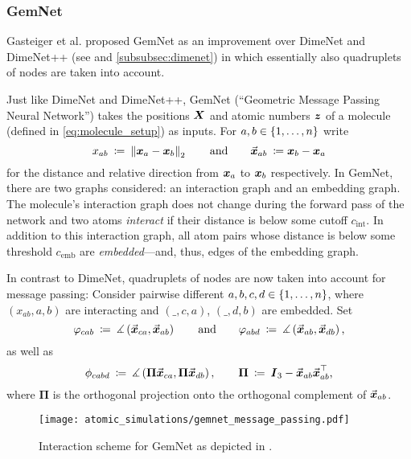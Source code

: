 \subsubsection{GemNet}
\label{subsubsec:gemnet}

Gasteiger et al. proposed GemNet \cite{https://doi.org/10.48550/arxiv.2106.08903} 
as an improvement over DimeNet and DimeNet++ (see 
\cite{DBLP:journals/corr/abs-2003-03123, https://doi.org/10.48550/arxiv.2011.14115} 
and \ref{subsubsec:dimenet}) in which essentially also quadruplets of nodes are
taken into account. 

Just like DimeNet and DimeNet++, GemNet (\enquote{Geometric Message Passing Neural Network}) takes the positions $\boldsymbol{X}$ and atomic numbers 
$\boldsymbol{z}$ of a molecule (defined in \eqref{eq:molecule_setup}) as inputs. For
$a, b \in \left\{1, \dots, n\right\}$ write
\[
    x_{ab} \: \coloneqq \: \left\lVert\boldsymbol{x}_a - \boldsymbol{x}_b\right\rVert_2 
    \qquad \text{and} \qquad 
    \vec{\boldsymbol{x}}_{ab} \: \coloneqq \boldsymbol{x}_b - \boldsymbol{x}_a
\]
for the distance and relative direction from $\boldsymbol{x}_a$ to $\boldsymbol{x}_b$ respectively.
In GemNet, there are two graphs considered: an interaction graph and an embedding graph.
The molecule's interaction graph does not change during the forward pass of the network and 
two atoms \textit{interact} if their distance is below some 
cutoff $c_{\text{int}}$. In addition to this interaction graph, all atom pairs 
whose distance is below some threshold $c_{\text{emb}}$ are \textit{embedded}---and, thus, edges 
of the embedding graph.

In contrast to DimeNet, quadruplets of 
nodes are now taken into account for message passing: Consider pairwise different $a, b, c, d \in \left\{1, \dots, n\right\}$,
where $(x_{ab}, a, b)$ are interacting and $(\_, c, a)$, $(\_, d, b)$ are
embedded. Set
\[
    \varphi_{cab} \: \coloneqq \: 
    \measuredangle \left( \vec{\boldsymbol{x}}_{ca}, \vec{\boldsymbol{x}}_{ab} \right)
    \qquad \text{and} \qquad
    \varphi_{abd} \: \coloneqq \: 
    \measuredangle \left( \vec{\boldsymbol{x}}_{ab}, \vec{\boldsymbol{x}}_{db} \right) \text{,}
\]
as well as 
\[
    \phi_{cabd} \: \coloneqq \: \measuredangle \left( \boldsymbol{\Pi} \vec{\boldsymbol{x}}_{ca}, \boldsymbol{\Pi} \vec{\boldsymbol{x}}_{db} \right),
    \qquad \boldsymbol{\Pi} \: \coloneqq \: \boldsymbol{I}_3 - \vec{\boldsymbol{x}}_{ab} \vec{\boldsymbol{x}}_{ab}^\top \text{,}
\]
where $\boldsymbol{\Pi}$ is the orthogonal projection onto the orthogonal
complement of $\vec{\boldsymbol{x}}_{ab}$.

\begin{figure}[H]
    \centering
    \texttt{[image: atomic\_simulations/gemnet\_message\_passing.pdf]}
    \caption{Interaction scheme for GemNet as depicted in 
    \cite{https://doi.org/10.48550/arxiv.2106.08903}.}
\end{figure}

